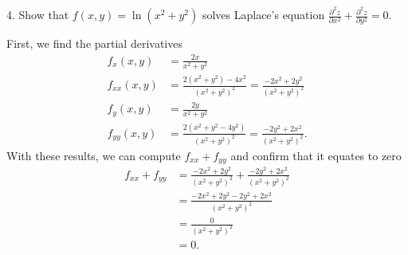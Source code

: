 \documentclass{report}
\begin{document}
    \bigbreak \noindent 
    \begin{mdframed}
        4. Show that $f(x, y)=\ln \left(x^2+y^2\right)$ solves Laplace's equation $\frac{\partial^2 z}{\partial x^2}+\frac{\partial^2 z}{\partial y^2}=0$.
    \end{mdframed}
    \bigbreak \noindent 
    First, we find the partial derivatives
    \begin{align*}
        f_{x}(x,y) &= \frac{2x}{x^{2}+y^{2}} \\
        f_{xx}(x,y) &= \frac{2(x^{2} + y^{2}) - 4x^{2}}{(x^{2}+y^{2})^{2}}  = \frac{-2x^{2}+2y^{2}}{(x^{2}+y^{2})^{2}} \\
        f_{y}(x,y) &= \frac{2y}{x^{2}+y^{2}} \\
                   f_{yy}(x,y)&=\frac{2(x^{2}+y^{2}-4y^{2})}{(x^{2}+y^{2})^{2}} = \frac{-2y^{2}+2x^{2}}{(x^{2}+y^{2})^{2}}
    .\end{align*}
    \bigbreak \noindent 
    With these results, we can compute $f_{xx} + f_{yy}$ and confirm that it equates to zero
    \begin{align*}
        f_{xx} + f_{yy} &= \frac{-2x^{2}+2y^{2}}{(x^{2}+y^{2})^{2}} + \frac{-2y^{2}+2x^{2}}{(x^{2}+y^{2})^{2}} \\
        &=\frac{-2x^{2}+2y^{2}-2y^{2}+2x^{2}}{(x^{2}+y^{2})^{2}} \\
        &=\frac{0}{(x^{2}+y^{2})^{2}} \\
        &=0
    .\end{align*}
\end{document}
